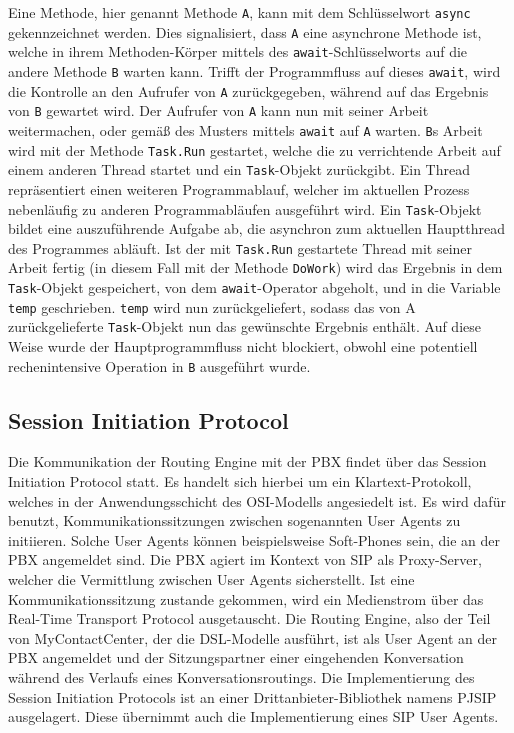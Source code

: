 Eine Methode, hier genannt Methode \texttt{A}, kann mit dem Schlüsselwort \texttt{async} gekennzeichnet werden. Dies signalisiert, dass \texttt{A} eine asynchrone Methode ist, welche in ihrem Methoden-Körper mittels des \texttt{await}-Schlüsselworts auf die andere Methode \texttt{B} warten kann. Trifft der Programmfluss auf dieses \texttt{await}, wird die Kontrolle an den Aufrufer von \texttt{A} zurückgegeben, während auf das Ergebnis von \texttt{B} gewartet wird. Der Aufrufer von \texttt{A} kann nun mit seiner Arbeit weitermachen, oder gemäß des Musters mittels \texttt{await} auf \texttt{A} warten. \texttt{B}s Arbeit wird mit der Methode \texttt{Task.Run} gestartet, welche die zu verrichtende Arbeit auf einem anderen Thread startet und ein \texttt{Task}-Objekt zurückgibt. Ein Thread repräsentiert einen weiteren Programmablauf, welcher im aktuellen Prozess nebenläufig zu anderen Programmabläufen ausgeführt wird. Ein \texttt{Task}-Objekt bildet eine auszuführende Aufgabe ab, die asynchron zum aktuellen Hauptthread des Programmes abläuft. Ist der mit \texttt{Task.Run} gestartete Thread mit seiner Arbeit fertig (in diesem Fall mit der Methode \texttt{DoWork}) wird das Ergebnis in dem \texttt{Task}-Objekt gespeichert, von dem \texttt{await}-Operator abgeholt, und in die Variable \texttt{temp} geschrieben. \texttt{temp} wird nun zurückgeliefert, sodass das von A zurückgelieferte \texttt{Task}-Objekt nun das gewünschte Ergebnis enthält. Auf diese Weise wurde der Hauptprogrammfluss nicht blockiert, obwohl eine potentiell rechenintensive Operation in \texttt{B} ausgeführt wurde.

\subsection{Session Initiation Protocol}
\label{subsec:Session Initiation Protocol}
Die Kommunikation der Routing Engine mit der PBX findet über das Session Initiation Protocol statt. Es handelt sich hierbei um ein Klartext-Protokoll, welches in der Anwendungsschicht des OSI-Modells angesiedelt ist. Es wird dafür benutzt, Kommunikationssitzungen zwischen sogenannten User Agents zu initiieren. Solche User Agents können beispielsweise Soft-Phones sein, die an der PBX angemeldet sind. Die PBX agiert im Kontext von SIP als Proxy-Server, welcher die Vermittlung zwischen User Agents sicherstellt. Ist eine Kommunikationssitzung zustande gekommen, wird ein Medienstrom über das Real-Time Transport Protocol ausgetauscht. Die Routing Engine, also der Teil von MyContactCenter, der die DSL-Modelle ausführt, ist als User Agent an der PBX angemeldet und der Sitzungspartner einer eingehenden Konversation während des Verlaufs eines Konversationsroutings. Die Implementierung des Session Initiation Protocols ist an einer Drittanbieter-Bibliothek namens PJSIP ausgelagert. Diese übernimmt auch die Implementierung eines SIP User Agents. 

